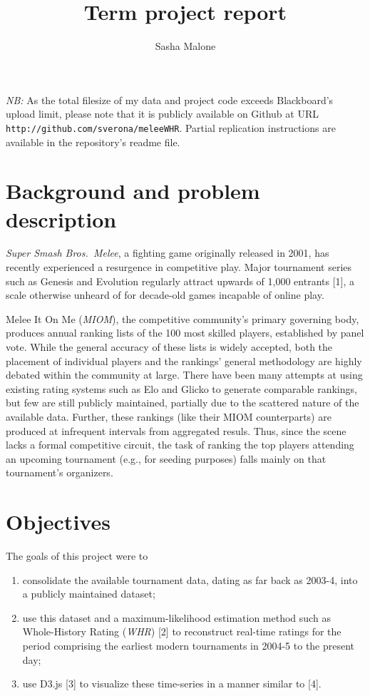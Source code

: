 \documentclass[10pt]{article}
\title{Term project report}
\author{Sasha Malone}
\theoremstyle{definition}
\theoremstyle{remark}
\providecommand{\tightlist}{%
      \setlength{\itemsep}{0pt}\setlength{\parskip}{0pt}}
\begin{document}
\emph{NB:} As the total filesize of my data and project code exceeds
Blackboard's upload limit, please note that it is publicly available on Github
at URL \texttt{http://github.com/sverona/meleeWHR}. Partial replication
instructions are available in the repository's readme file.

\hypertarget{background-and-problem-description}{%
\section{Background and problem description}\label{background-and-problem-description}}

\emph{Super Smash Bros.~Melee}, a fighting game
originally released in 2001, has recently experienced a resurgence in
competitive play. Major tournament series such as Genesis and Evolution
regularly attract upwards of 1,000 entrants {[}1{]}, a scale otherwise
unheard of for decade-old games incapable of online play.

Melee It On Me (\emph{MIOM}), the competitive community's primary
governing body, produces annual ranking lists of the 100 most skilled
players, established by panel vote. While the general accuracy of these
lists is widely accepted, both the placement of individual players and
the rankings' general methodology are highly debated within the community
at large. There have been many attempts at using existing rating systems such
as Elo and Glicko to generate comparable rankings, but few are still
publicly maintained, partially due to the scattered nature of the
available data. Further, these rankings (like their MIOM counterparts)
are produced at infrequent intervals from aggregated resuls. Thus, since
the scene lacks a formal competitive circuit, the task of ranking the
top players attending an upcoming tournament (e.g., for seeding
purposes) falls mainly on that tournament's organizers.

\hypertarget{objectives}{%
\section{Objectives}\label{objectives}}

The goals of this project were to

\begin{enumerate}
\def\labelenumi{\roman{enumi}.}
\tightlist
\item
  consolidate the available tournament data, dating as far back as
  2003-4, into a publicly maintained dataset;
\item
  use this dataset and a maximum-likelihood estimation method such as
  Whole-History Rating (\emph{WHR}) {[}2{]} to reconstruct real-time
  ratings for the period comprising the earliest modern tournaments in
  2004-5 to the present day;
\item
  use D3.js {[}3{]} to visualize these time-series in a manner similar
  to {[}4{]}.
\end{enumerate}
\end{document}
